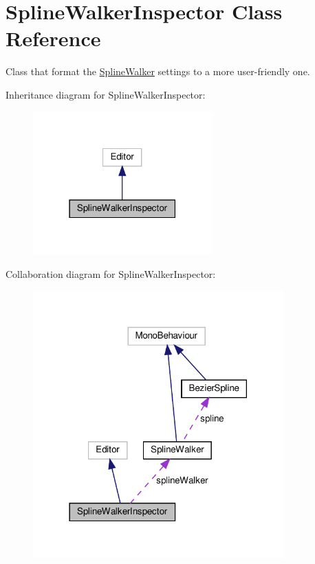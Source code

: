 \hypertarget{classSplineWalkerInspector}{}\section{Spline\+Walker\+Inspector Class Reference}
\label{classSplineWalkerInspector}


Class that format the \hyperlink{classSplineWalker}{Spline\+Walker} settings to a more user-\/friendly one.  




Inheritance diagram for Spline\+Walker\+Inspector\+:\nopagebreak
\begin{figure}[H]
\begin{center}
\leavevmode
\includegraphics[width=195pt]{classSplineWalkerInspector__inherit__graph}
\end{center}
\end{figure}


Collaboration diagram for Spline\+Walker\+Inspector\+:\nopagebreak
\begin{figure}[H]
\begin{center}
\leavevmode
\includegraphics[width=273pt]{classSplineWalkerInspector__coll__graph}
\end{center}
\end{figure}
